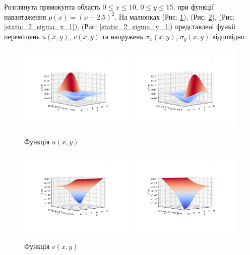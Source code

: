 Розглянута прямокунта область $0 \le x \le 10$, $0 \le y \le 15$, при функції навантаження $p(x)=(x-2.5)^2$.
На малюнках (Рис: \ref{static_2_u_1}), (Рис: \ref{static_2_v_1}), (Рис: \ref{static_2_sigma_x_1}), (Рис: \ref{static_2_sigma_y_1})
представлені функіі переміщень $u(x,y)$, $v(x,y)$ та напружень $\sigma_x(x,y)$, $\sigma_y(x,y)$ відповідно.
\begin{figure}[h!]
    \begin{center}
        \includegraphics[width=0.49\textwidth, scale=1]{images/results/static_2/u_1.png}
        \includegraphics[width=0.49\textwidth, scale=1]{images/results/static_2/u_2.png}
        \caption{Функція $u(x, y)$}\label{static_2_u_1}
    \end{center}
\end{figure}
\newpage
\begin{figure}[h!]
    \begin{center}
        \includegraphics[width=0.49\textwidth, scale=1]{images/results/static_2/v_1.png}
        \includegraphics[width=0.49\textwidth, scale=1]{images/results/static_2/v_2.png}
        \caption{Функція $v(x, y)$}\label{static_2_v_1}
    \end{center}
\end{figure}
